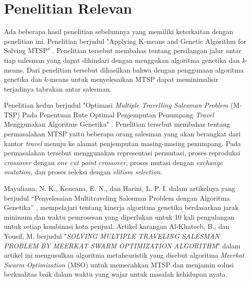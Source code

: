 
\section{Penelitian Relevan}

Ada beberapa hasil penelitian sebelumnya yang memiliki keterkaitan dengan penelitian ini. Penelitian berjudul "Applying K-means and Genetic Algorithm for Solving MTSP" \cite{inproceedings}. Penelitian tersebut membahas tentang persilangan jalur antar tiap salesman yang dapat dihindari dengan menggukan algoritma genetika dan \textit{k}-means. Dari penelitian tersebut dihasilkan bahwa dengan penggunaan algoritma genetika dan $k$-means untuk menyelesaikan MTSP dapat meminimalisir terjadinya tabrakan antar salesman.

Penelitian kedua berjudul "Optimasi \textit{Multiple Travelling Salesman Problem} (M-TSP) Pada Penentuan Rute Optimal Penjemputan Penumpang \textit{Travel} Menggunakan Algoritme Genetika" \cite{raditya2017optimasi}. Penelitian tersebut membahas tentang permasalahan MTSP yaitu beberapa orang salesman yang akan berangkat dari kantor \textit{travel} menuju ke alamat penjemputan masing-masing penumpang. Pada permasalahan tersebut menggunakan representasi permutasi, proses reproduksi \textit{crossover} dengan \textit{one cut point crossover}, proses mutasi dengan \textit{exchange mutation}, dan proses seleksi dengan \textit{elitism selection}.

Mayuliana, N. K., Kencana, E. N., dan Harini, L. P. I. dalam artikelnya yang berjudul “Penyelesaian Multitraveling Salesman Problem dengan Algoritma Genetika” \cite{mayuliana2015penyelesaian}, mempelajari tentang kinerja algoritma genetika berdasarkan jarak minimum dan waktu pemrosesan yang diperlukan untuk 10 kali pengulangan untuk setiap kombinasi kota penjual. Artikel karangan Al-Khateeb, B., dan Yousif, M. berjudul "\textit{SOLVING MULTIPLE TRAVELING SALESMAN PROBLEM BY MEERKAT SWARM OPTIMIZATION ALGORITHM}" \cite{al2019solving} dalam artikel ini mengusulkan algoritma metaheuristik yang disebut algoritma \textit{Meerkat Swarm Optimization} (MSO) untuk memecahkan MTSP dan menjamin solusi berkualitas baik dalam waktu yang wajar untuk masalah kehidupan nyata.
